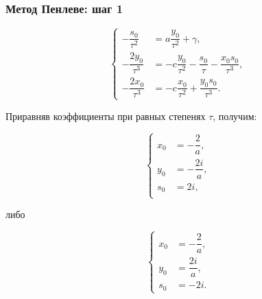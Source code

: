 \documentclass[hyperref={pdftex,unicode}]{beamer}
\begin{document}
\begin{frame}

\frametitle{Метод Пенлеве: шаг 1}

$$
        \left\{
                \begin{aligned}
                        -\dfrac{s_0}{\tau^2} &= a \dfrac{y_0}{\tau^2} + \gamma, \\
                        -\dfrac{2y_0}{\tau^3} &= -c \dfrac{y_0}{\tau^2} - \dfrac{s_0}{\tau} - \dfrac{x_0 s_0}{\tau^3}, \\
                        -\dfrac{2x_0}{\tau^{3}} &= -c \dfrac{x_0}{\tau^2} + \dfrac{y_0 s_0}{\tau^3}.
                \end{aligned}
        \right.
$$

\vspace{20pt}

Приравняв коэффициенты при равных степенях $ \tau $, получим:

\vspace{10pt}

\begin{minipage}[h!]{0.4\linewidth}
$$
\left\{
\begin{aligned}
  x_0 &= - \dfrac{2}{a}, \\
  y_0 &= -\dfrac{2i}{a}, \\
  s_0 &= 2i, \\
\end{aligned}
\right.
$$
\end{minipage}
\hfill
либо
\hfill
\begin{minipage}[h!]{0.4\linewidth}
$$
\left\{
\begin{aligned}
  x_0 &= - \dfrac{2}{a}, \\
  y_0 &= \dfrac{2i}{a}, \\
  s_0 &= - 2i. 
\end{aligned}
\right.
$$
\end{minipage}


\end{frame}
\end{document}
